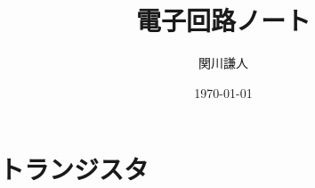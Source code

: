 \documentclass[a4paper,11pt]{ltjsarticle}
\begin{document}
\title{電子回路ノート}
\author{関川謙人}
\date{\today}
\maketitle

\section*{トランジスタ}
\subsecton{}
\end{document}
